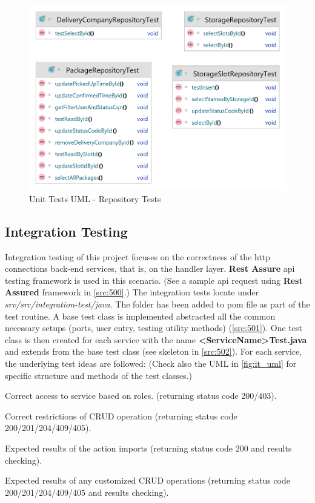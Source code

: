 \begin{figure}[H]
    \centering
    \includegraphics[width=1\linewidth]{images/test/repository_tests_white.png}
    \caption{Unit Tests UML - Repository Tests}
    \label{fig:ut_uml_repo}
\end{figure}


\subsection{Integration Testing}
\label{subsec:test-api}

Integration testing of this project focuses on the correctness of the http connections back-end services, that is, on the handler layer. \textbf{Rest Assure} \cite{test-rest-asstured} api testing framework is used in this scenario. (See a sample api request using \textbf{Rest Assured} framework in \autoref{src:500}.)
The integration tests locate under \textit{srv/src/integration-test/java}. The folder has been added to pom file as part of the test routine. A base test class is implemented abstracted all the common necessary setups (ports, user entry, testing utility methods) (\autoref{src:501}). One test class is then created for each service with the name \textbf{<ServiceName>Test.java} and extends from the base test class (see skeleton in \autoref{src:502}). For each service, the underlying test ideas are followed: (Check also the UML in \autoref{fig:it_uml} for specific structure and methods of the test classes.)
\begin{compactenum}
	\item Correct access to service based on roles. (returning status code 200/403).
    \item Correct restrictions of CRUD operation (returning status code 200/201/204/409/405).
    \item Expected results of the action imports (returning status code 200 and results checking).
    \item Expected results of any customized CRUD operations (returning status code 200/201/204/409/405 and results checking).
\end{compactenum}

